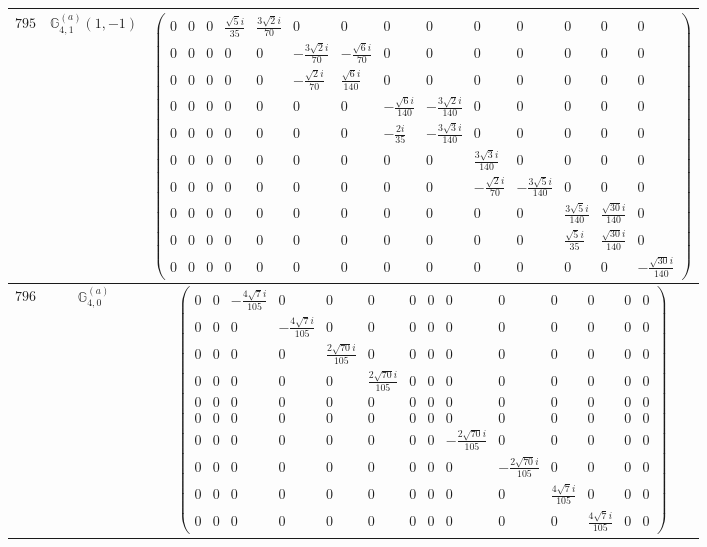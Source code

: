 \documentclass[fleqn,8pt,landscape]{jsarticle}
\begin{document}
\begin{center}
\begin{longtable}{ccc}
$ 795 $ & $ \mathbb{G}_{4,1}^{(a)}(1,-1) $ & $ \begin{pmatrix} 0 & 0 & 0 & \frac{\sqrt{5} i}{35} & \frac{3 \sqrt{2} i}{70} & 0 & 0 & 0 & 0 & 0 & 0 & 0 & 0 & 0 \\ 0 & 0 & 0 & 0 & 0 & - \frac{3 \sqrt{2} i}{70} & - \frac{\sqrt{6} i}{70} & 0 & 0 & 0 & 0 & 0 & 0 & 0 \\ 0 & 0 & 0 & 0 & 0 & - \frac{\sqrt{2} i}{70} & \frac{\sqrt{6} i}{140} & 0 & 0 & 0 & 0 & 0 & 0 & 0 \\ 0 & 0 & 0 & 0 & 0 & 0 & 0 & - \frac{\sqrt{6} i}{140} & - \frac{3 \sqrt{2} i}{140} & 0 & 0 & 0 & 0 & 0 \\ 0 & 0 & 0 & 0 & 0 & 0 & 0 & - \frac{2 i}{35} & - \frac{3 \sqrt{3} i}{140} & 0 & 0 & 0 & 0 & 0 \\ 0 & 0 & 0 & 0 & 0 & 0 & 0 & 0 & 0 & \frac{3 \sqrt{3} i}{140} & 0 & 0 & 0 & 0 \\ 0 & 0 & 0 & 0 & 0 & 0 & 0 & 0 & 0 & - \frac{\sqrt{2} i}{70} & - \frac{3 \sqrt{5} i}{140} & 0 & 0 & 0 \\ 0 & 0 & 0 & 0 & 0 & 0 & 0 & 0 & 0 & 0 & 0 & \frac{3 \sqrt{5} i}{140} & \frac{\sqrt{30} i}{140} & 0 \\ 0 & 0 & 0 & 0 & 0 & 0 & 0 & 0 & 0 & 0 & 0 & \frac{\sqrt{5} i}{35} & \frac{\sqrt{30} i}{140} & 0 \\ 0 & 0 & 0 & 0 & 0 & 0 & 0 & 0 & 0 & 0 & 0 & 0 & 0 & - \frac{\sqrt{30} i}{140} \end{pmatrix} $ \\ \hline
$ 796 $ & $ \mathbb{G}_{4,0}^{(a)} $ & $ \begin{pmatrix} 0 & 0 & - \frac{4 \sqrt{7} i}{105} & 0 & 0 & 0 & 0 & 0 & 0 & 0 & 0 & 0 & 0 & 0 \\ 0 & 0 & 0 & - \frac{4 \sqrt{7} i}{105} & 0 & 0 & 0 & 0 & 0 & 0 & 0 & 0 & 0 & 0 \\ 0 & 0 & 0 & 0 & \frac{2 \sqrt{70} i}{105} & 0 & 0 & 0 & 0 & 0 & 0 & 0 & 0 & 0 \\ 0 & 0 & 0 & 0 & 0 & \frac{2 \sqrt{70} i}{105} & 0 & 0 & 0 & 0 & 0 & 0 & 0 & 0 \\ 0 & 0 & 0 & 0 & 0 & 0 & 0 & 0 & 0 & 0 & 0 & 0 & 0 & 0 \\ 0 & 0 & 0 & 0 & 0 & 0 & 0 & 0 & 0 & 0 & 0 & 0 & 0 & 0 \\ 0 & 0 & 0 & 0 & 0 & 0 & 0 & 0 & - \frac{2 \sqrt{70} i}{105} & 0 & 0 & 0 & 0 & 0 \\ 0 & 0 & 0 & 0 & 0 & 0 & 0 & 0 & 0 & - \frac{2 \sqrt{70} i}{105} & 0 & 0 & 0 & 0 \\ 0 & 0 & 0 & 0 & 0 & 0 & 0 & 0 & 0 & 0 & \frac{4 \sqrt{7} i}{105} & 0 & 0 & 0 \\ 0 & 0 & 0 & 0 & 0 & 0 & 0 & 0 & 0 & 0 & 0 & \frac{4 \sqrt{7} i}{105} & 0 & 0 \end{pmatrix} $ \\ \hline

\end{longtable}
\end{center}
\end{document}
